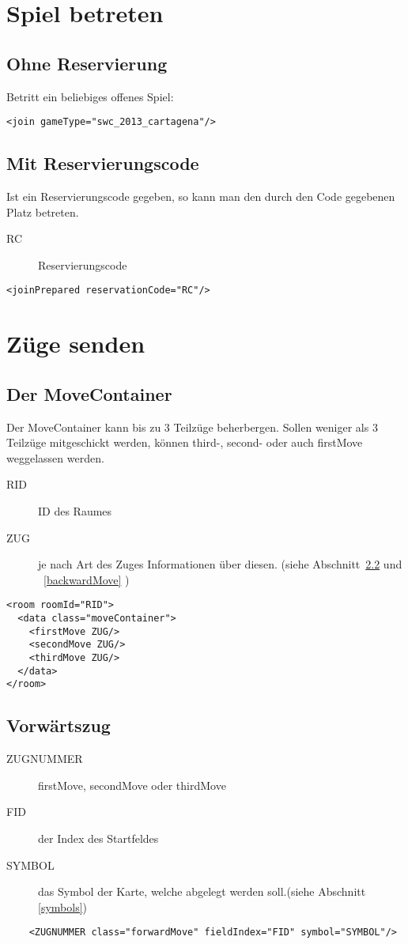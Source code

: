 \documentclass[12pt,a4paper, ngerman, oneside]{scrartcl}
\begin{document}
\section{Spiel betreten}
\subsection{Ohne Reservierung}
Betritt ein beliebiges offenes Spiel:
\begin{verbatim}
<join gameType="swc_2013_cartagena"/>
\end{verbatim}
\subsection{Mit Reservierungscode}
Ist ein Reservierungscode gegeben, so kann man den durch den Code gegebenen Platz betreten.
\begin{description}
\item[RC] Reservierungscode
\end{description}
\begin{verbatim}
<joinPrepared reservationCode="RC"/>
\end{verbatim}

\section{Züge senden}

\subsection{\label{moveContainer}Der MoveContainer}
Der MoveContainer kann bis zu 3 Teilzüge beherbergen. Sollen weniger als 3
Teilzüge mitgeschickt werden, können third-, second- oder auch firstMove
weggelassen werden.
\begin{description}
\item[RID] ID des Raumes
\item[ZUG] je nach Art des Zuges Informationen über diesen. (siehe
Abschnitt~\ref{forwardMove} und ~\ref{backwardMove} )
\end{description}
\begin{verbatim}
<room roomId="RID">
  <data class="moveContainer">
    <firstMove ZUG/>
    <secondMove ZUG/>
    <thirdMove ZUG/>
  </data>
</room>

\end{verbatim}
\subsection{Vorwärtszug}
\label{forwardMove}
\begin{description}
\item[ZUGNUMMER] firstMove, secondMove oder thirdMove
\item[FID] der Index des Startfeldes
\item[SYMBOL] das Symbol der Karte, welche abgelegt werden soll.(siehe
Abschnitt \ref{symbols})
\end{description}
\begin{verbatim}
	<ZUGNUMMER class="forwardMove" fieldIndex="FID" symbol="SYMBOL"/>
\end{verbatim}
\end{document}
